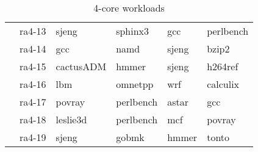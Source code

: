\begin{table}[ht]
{\begin{tabular}{|r|r|llll|}
			 & ra4-13	 & sjeng & sphinx3 & gcc & perlbench \\ 
			 & ra4-14	 & gcc & namd & sjeng & bzip2 \\ 
			 & ra4-15	 & cactusADM & hmmer & sjeng & h264ref \\ 
			 & ra4-16	 & lbm & omnetpp & wrf & calculix \\ 
			 & ra4-17	 & povray & perlbench & astar & gcc \\ 
			 & ra4-18	 & leslie3d & perlbench & mcf & povray \\ 
			 & ra4-19	 & sjeng & gobmk & hmmer & tonto \\ 
\hline
\end{tabular}%
} 
\caption{4-core workloads}
\label{tbl:benchmark_workloads:4-workloads}
\end{table}
